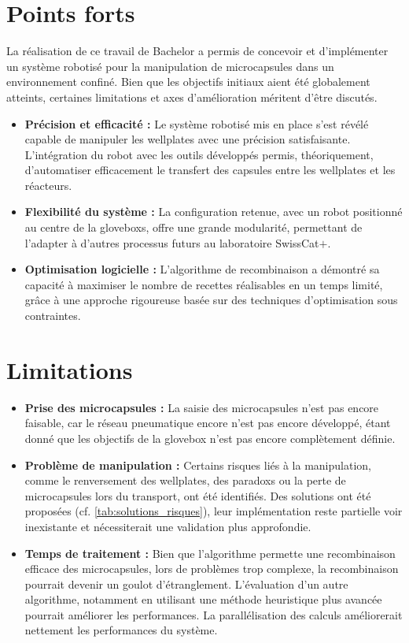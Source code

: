 \section{Points forts}
La réalisation de ce travail de Bachelor a permis de concevoir et d'implémenter un système robotisé pour la manipulation de \glspl{microcapsule} dans un environnement confiné. Bien que les objectifs initiaux aient été globalement atteints, certaines limitations et axes d'amélioration méritent d'être discutés.
\begin{itemize}
    \item \textbf{Précision et efficacité :} Le système robotisé mis en place s'est révélé capable de manipuler les \glspl{wellplate} avec une précision satisfaisante. L'intégration du robot avec les outils développés permis, théoriquement, d'automatiser efficacement le transfert des capsules entre les \glspl{wellplate} et les réacteurs.
    \item \textbf{Flexibilité du système :} La configuration retenue, avec un robot positionné au centre de la \glspl{glovebox}, offre une grande modularité, permettant de l'adapter à d'autres processus futurs au laboratoire SwissCat$+$.
    \item \textbf{Optimisation logicielle :} L'algorithme de recombinaison a démontré sa capacité à maximiser le nombre de recettes réalisables en un temps limité, grâce à une approche rigoureuse basée sur des techniques d'optimisation sous contraintes.
\end{itemize}
\section{Limitations}
\begin{itemize}
    \item \textbf{Prise des microcapsules :} La saisie des \glspl{microcapsule} n'est pas encore faisable, car le réseau pneumatique encore n'est pas encore développé, étant donné que les objectifs de la \gls{glovebox} n'est pas encore complètement définie.
    \item \textbf{Problème de manipulation :} Certains risques liés à la manipulation, comme le renversement des \glspl{wellplate}, des \glspl{paradox} ou la perte de \glspl{microcapsule} lors du transport, ont été identifiés. Des solutions ont été proposées (cf. \autoref{tab:solutions_risques}), leur implémentation reste partielle voir inexistante et nécessiterait une validation plus approfondie.
    \item \textbf{Temps de traitement : } Bien que l'algorithme permette une recombinaison efficace des \glspl{microcapsule}, lors de problèmes trop complexe, la recombinaison pourrait devenir un goulot d'étranglement. L'évaluation d'un autre algorithme, notamment en utilisant une méthode heuristique plus avancée pourrait améliorer les performances. La parallélisation des calculs améliorerait nettement les performances du système.
\end{itemize}
